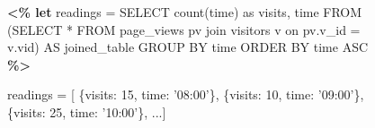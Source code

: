  \begin{figure}[hbt!]
 \centering
 \begin{minipage}[c]{7cm}
 \begin{minipage}[c]{7cm}
 \begin{code}
 \textbf{<\% let} readings = 
    SELECT count(time) as visits, time
    FROM (SELECT * FROM page_views pv 
   	     join visitors v 
          on pv.v_id = v.vid) AS joined_table
    GROUP BY time 
    ORDER BY time ASC \textbf{\%>}
 \end{code}
 \vspace*{-0.4cm}
 \label{figure:first-running-example:data-retrieval}
 \vspace*{0.3cm}
 \end{minipage}
 
 
 
 \begin{minipage}[c]{7cm}
 \begin{code}
 readings = [
    \{visits: 15, time: '08:00'\}, 
    \{visits: 10, time: '09:00'\},
    \{visits: 25, time: '10:00'\},  ...]
 \end{code}
 \vspace*{-0.4cm}
 \label{figure:running-example:query-result}
 \vspace*{0.3cm}
 \end{minipage}
 

\end{minipage}
\end{figure}
